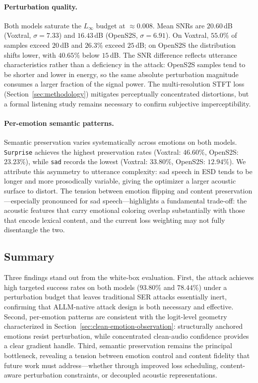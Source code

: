\paragraph{Perturbation quality.}
Both models saturate the $L_\infty$ budget at $\approx 0.008$.
Mean SNRs are $20.60\,$dB (Voxtral, $\sigma = 7.33$) and $16.43\,$dB (OpenS2S, $\sigma = 6.91$).
On Voxtral, $55.0\%$ of samples exceed $20\,$dB and $26.3\%$ exceed $25\,$dB; on OpenS2S the distribution shifts lower, with $40.65\%$ below $15\,$dB.
The SNR difference reflects utterance characteristics rather than a deficiency in the attack: OpenS2S samples tend to be shorter and lower in energy, so the same absolute perturbation magnitude consumes a larger fraction of the signal power.
The multi-resolution STFT loss (Section~\ref{sec:methodology}) mitigates perceptually concentrated distortions, but a formal listening study remains necessary to confirm subjective imperceptibility.

\paragraph{Per-emotion semantic patterns.}
Semantic preservation varies systematically across emotions on both models.
\texttt{Surprise} achieves the highest preservation rates (Voxtral: $46.60\%$, OpenS2S: $23.23\%$), while \texttt{sad} records the lowest (Voxtral: $33.80\%$, OpenS2S: $12.94\%$).
We attribute this asymmetry to utterance complexity: sad speech in ESD tends to be longer and more prosodically variable, giving the optimizer a larger acoustic surface to distort.
The tension between emotion flipping and content preservation---especially pronounced for sad speech---highlights a fundamental trade-off: the acoustic features that carry emotional coloring overlap substantially with those that encode lexical content, and the current loss weighting may not fully disentangle the two.


\subsection{Summary}
\label{sec:exp_summary}

Three findings stand out from the white-box evaluation.
First, the attack achieves high targeted success rates on both models ($93.80\%$ and $78.44\%$) under a perturbation budget that leaves traditional SER attacks essentially inert, confirming that ALLM-native attack design is both necessary and effective.
Second, per-emotion patterns are consistent with the logit-level geometry characterized in Section~\ref{sec:clean-emotion-observation}: structurally anchored emotions resist perturbation, while concentrated clean-audio confidence provides a clear gradient handle.
Third, semantic preservation remains the principal bottleneck, revealing a tension between emotion control and content fidelity that future work must address---whether through improved loss scheduling, content-aware perturbation constraints, or decoupled acoustic representations.
